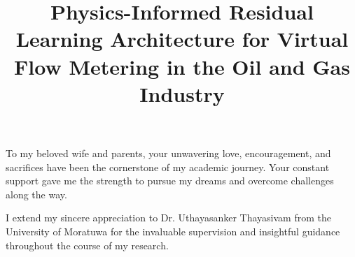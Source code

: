 \documentclass[12pt,APA]{uomthesis}
\begin{document}
\title{Physics-Informed Residual Learning Architecture for Virtual Flow Metering in the Oil and Gas Industry}


\maketitle



To my beloved wife and parents, your unwavering love, encouragement, and sacrifices have been the cornerstone of my academic journey. Your constant support gave me the strength to pursue my dreams and overcome challenges along the way.

I extend my sincere appreciation to Dr. Uthayasanker Thayasivam from the University of Moratuwa for the invaluable supervision and insightful guidance throughout the course of my research.
\end{document}
